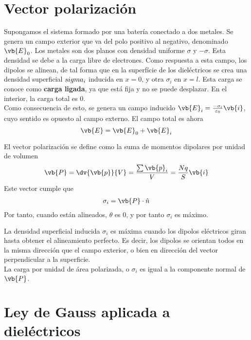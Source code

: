 \documentclass{./FisicaII.tex}
\begin{document}
\section{Vector polarización}
Supongamos el sistema formado por una batería conectado a dos metales. Se genera un campo
exterior que va del polo positivo al negativo, denominado \(\vb{E}_{0}\). Los metales son
dos planos con densidad uniforme \(\sigma \) y \(-\sigma \). Esta densidad se debe a la
carga libre de electrones. Como respuesta a esta campo, los dipolos se alinean, de tal
forma que en la superfície de los dieléctricos se crea una densidad superficial
\(\-sigma _{i}\) inducida en \(x=0\), y otra \(\sigma _{i}\) en \(x=l\). Esta carga se
conoce como \textbf{carga ligada}, ya que está fija y no se puede desplazar. En el
interior, la carga total es \(0\).\\
Como consecuencia de esto, se genera un campo inducido \(\vb{E}_i = \frac{-\sigma _{i}}{\varepsilon _{0}} \vb{i}\), cuyo sentido es
opuesto al campo externo. El campo total es ahora
\[
	\vb{E} = \vb{E}_0 + \vb{E}_i
\]
\begin{defin}
	El vector polarización se define como la suma de momentos dipolares por unidad de volumen
	\begin{equation}
		\begin{split}
			\vb{P} = \dv{\vb{p}}{V} = \frac{\sum \vb{p}_i}{V} = \frac{Nq}{S} \vb{i}
		\end{split}
	\end{equation}
	Este vector cumple que
	\begin{equation}
		\begin{split}
			\sigma _{i} = \vb{P} \cdot \hat{n}
		\end{split}
	\end{equation}
	Por tanto, cuando están alineados, \(\theta \) es \(0\), y por tanto \(\sigma _{i}\)
	es máximo.
\end{defin}
La densidad superficial inducida \(\sigma _{i}\) es máxima cuando los dipolos eléctricos
giran hasta obtener el alineamiento perfecto. Es decir, los dipolos se orientan todos
en la misma dirección que el campo exterior, o bien en dirección del vector
perpendicular a la superficie.\\
La carga por unidad de área polarizada, o \(\sigma _{i}\) es igual a la componente
normal de \(\vb{P}\).
\section{Ley de Gauss aplicada a dieléctricos}
\end{document}
